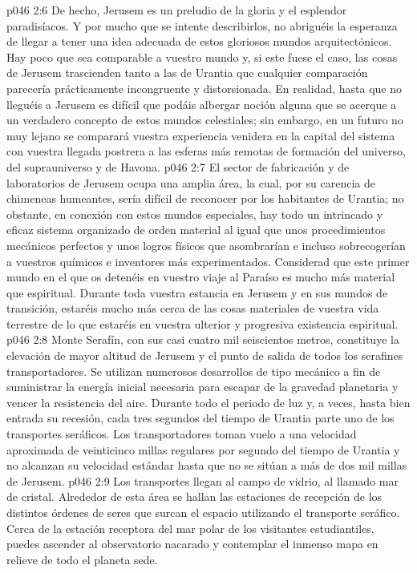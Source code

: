 \vs p046 2:6 De hecho, Jerusem es un preludio de la gloria y el esplendor paradisíacos. Y por mucho que se intente describirlos, no abriguéis la esperanza de llegar a tener una idea adecuada de estos gloriosos mundos arquitectónicos. Hay poco que sea comparable a vuestro mundo y, si este fuese el caso, las cosas de Jerusem trascienden tanto a las de Urantia que cualquier comparación parecería prácticamente incongruente y distorsionada. En realidad, hasta que no lleguéis a Jerusem es difícil que podáis albergar noción alguna que se acerque a un verdadero concepto de estos mundos celestiales; sin embargo, en un futuro no muy lejano se comparará vuestra experiencia venidera en la capital del sistema con vuestra llegada postrera a las esferas más remotas de formación del universo, del suprauniverso y de Havona.
\vs p046 2:7 \pc El sector de fabricación y de laboratorios de Jerusem ocupa una amplia área, la cual, por su carencia de chimeneas humeantes, sería difícil de reconocer por los habitantes de Urantia; no obstante, en conexión con estos mundos especiales, hay todo un intrincado y eficaz sistema organizado de orden material al igual que unos procedimientos mecánicos perfectos y unos logros físicos que asombrarían e incluso sobrecogerían a vuestros químicos e inventores más experimentados. Considerad que este primer mundo en el que os detenéis en vuestro viaje al Paraíso es mucho más material que espiritual. Durante toda vuestra estancia en Jerusem y en sus mundos de transición, estaréis mucho más cerca de las cosas materiales de vuestra vida terrestre de lo que estaréis en vuestra ulterior y progresiva existencia espiritual.
\vs p046 2:8 \pc Monte Serafín, con sus casi cuatro mil seiscientos metros, constituye la elevación de mayor altitud de Jerusem y el punto de salida de todos los serafines transportadores. Se utilizan numerosos desarrollos de tipo mecánico a fin de suministrar la energía inicial necesaria para escapar de la gravedad planetaria y vencer la resistencia del aire. Durante todo el periodo de luz y, a veces, hasta bien entrada su recesión, cada tres segundos del tiempo de Urantia parte uno de los transportes seráficos. Los transportadores toman vuelo a una velocidad aproximada de veinticinco millas regulares por segundo del tiempo de Urantia y no alcanzan su velocidad estándar hasta que no se sitúan a más de dos mil millas de Jerusem.
\vs p046 2:9 Los transportes llegan al campo de vidrio, al llamado mar de cristal. Alrededor de esta área se hallan las estaciones de recepción de los distintos órdenes de seres que surcan el espacio utilizando el transporte seráfico. Cerca de la estación receptora del mar polar de los visitantes estudiantiles, puedes ascender al observatorio nacarado y contemplar el inmenso mapa en relieve de todo el planeta sede.
